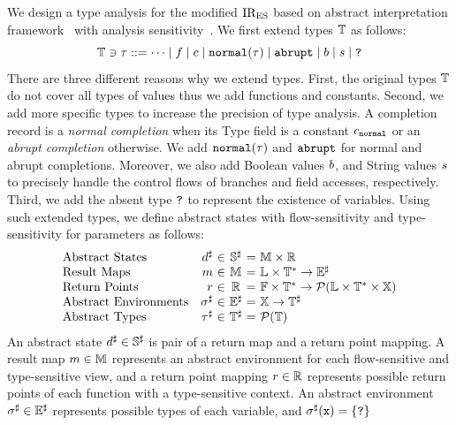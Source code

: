 We design a type analysis for the modified ${\text{IR}_\text{ES}}$ based on abstract
interpretation framework~\cite{ai1977, ai1992} with analysis
sensitivity~\cite{sens-toplas}.  We first extend types $\mathbb{T}$ as follows:
\[
  \mathbb{T} \ni \tau ::=
  \cdots \mid
  f \mid
  c \mid
  \texttt{normal}(\tau) \mid
  \texttt{abrupt} \mid
  b \mid
  s \mid
  \texttt{?}
\]
There are three different reasons why we extend types.  First, the original
types $\mathbb{T}$ do not cover all types of values thus we add functions and
constants.  Second, we add more specific types to increase the precision of type
analysis.  A completion record is a \textit{normal completion} when its Type
field is a constant $c_{\texttt{normal}}$ or an \textit{abrupt completion}
otherwise.  We add $\texttt{normal}(\tau)$ and $\texttt{abrupt}$ for normal and abrupt
completions.  Moreover, we also add Boolean values $b$, and String values
$s$ to precisely handle the control flows of branches and field accesses,
respectively.  Third, we add the absent type $\texttt{?}$ to represent the
existence of variables.  Using such extended types, we define abstract states
with flow-sensitivity and type-sensitivity for parameters as follows:
\[
  \begin{array}{lr@{~}c@{~}c@{~}r@{~}l}
    \text{Abstract States}
    &\aelem&\in&\adom&=& \rmapset \times \retpset\\

    \text{Result Maps}
    &\rmap&\in&\rmapset&=& \labset \times \tyset^* \rightarrow \aenvset\\

    \text{Return Points}
    &\retp&\in&\retpset&=& \funcset \times \tyset^*
    \rightarrow \partsof{\labset \times \tyset^* \times \varset} \\

    \text{Abstract Environments}
    &\aenv&\in&\aenvset&=&\varset \rightarrow \atyset\\

    \text{Abstract Types}
    &\aty&\in&\atyset&=&\partsof{\tyset}\\
  \end{array}
\]
An abstract state ${d}^\sharp \in {\mathbb{S}}^\sharp$ is pair of a return map and a return point
mapping.  A result map $m \in \mathbb{M}$ represents an abstract environment
for each flow-sensitive and type-sensitive view, and a return point mapping
$r \in \mathbb{R}$ represents possible return points of each function with
a type-sensitive context.  An abstract environment ${\sigma}^\sharp \in {\mathbb{E}}^\sharp$
represents possible types of each variable, and ${\sigma}^\sharp(\texttt{x}) = \{ \texttt{?} \}$
